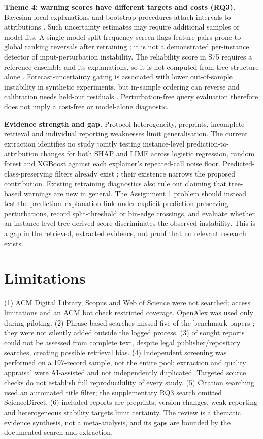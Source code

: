 \textbf{Theme 4: warning scores have different targets and costs (RQ3).} Bayesian local explanations and bootstrap procedures attach intervals to attributions \cite{S05,S81}. Such uncertainty estimates may require additional samples or model fits. A single-model split-frequency screen flags feature pairs prone to global ranking reversals after retraining \cite{S43}; it is not a demonstrated per-instance detector of input-perturbation instability. The reliability score in S75 requires a reference ensemble and its explanations, so it is not computed from tree structure alone \cite{S75}. Forecast-uncertainty gating is associated with lower out-of-sample instability in synthetic experiments, but in-sample ordering can reverse and calibration needs held-out residuals \cite{S77}. Perturbation-free query evaluation therefore does not imply a cost-free or model-alone diagnostic.

\textbf{Evidence strength and gap.} Protocol heterogeneity, \incPreprint{} preprints, incomplete retrieval and individual reporting weaknesses limit generalisation. The current extraction identifies no study jointly testing instance-level prediction-to-attribution changes for both SHAP and LIME across logistic regression, random forest and XGBoost against each explainer's repeated-call noise floor. Predicted-class-preserving filters already exist \cite{S09,S25,S62}; their existence narrows the proposed contribution. Existing retraining diagnostics \cite{S43} also rule out claiming that tree-based warnings are new in general. The Assignment 1 problem should instead test the prediction--explanation link under explicit prediction-preserving perturbations, record split-threshold or bin-edge crossings, and evaluate whether an instance-level tree-derived score discriminates the observed instability. This is a gap in the retrieved, extracted evidence, not proof that no relevant research exists.

\section{Limitations}\label{sec:lim}
(1) ACM Digital Library, Scopus and Web of Science were not searched; access limitations and an ACM bot check restricted coverage. OpenAlex was used only during piloting. (2) Phrase-based searches missed five of the \nKnown{} benchmark papers \cite{hwang2025,decker2025,lin2023,takefuji2025,hasnain2026}; they were not silently added outside the logged process. (3) \totalNotRetrieved{} of \totalSought{} sought reports could not be assessed from complete text, despite legal publisher/repository searches, creating possible retrieval bias. (4) Independent screening was performed on a 197-record sample, not the entire pool; extraction and quality appraisal were AI-assisted and not independently duplicated. Targeted source checks do not establish full reproducibility of every study. (5) Citation searching used an automated title filter; the supplementary RQ3 search omitted ScienceDirect. (6) \incPreprint{} included reports are preprints; version changes, weak reporting and heterogeneous stability targets limit certainty. The review is a thematic evidence synthesis, not a meta-analysis, and its gaps are bounded by the documented search and extraction.

